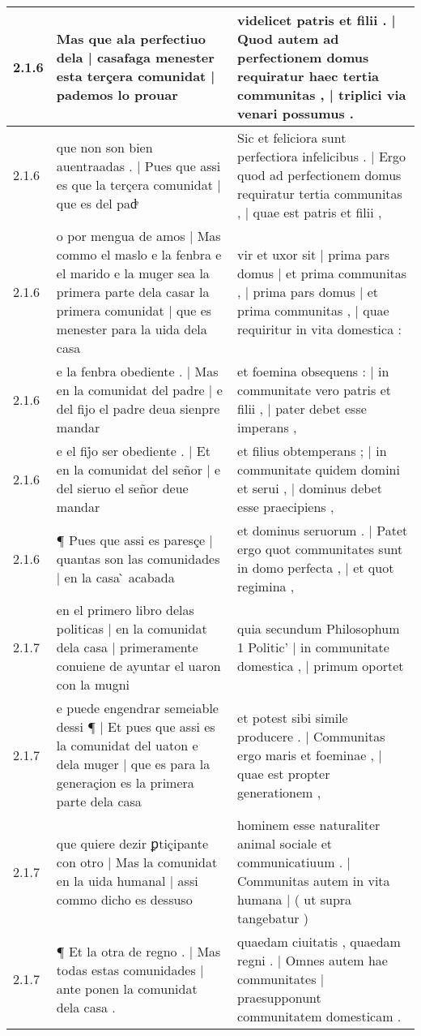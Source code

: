 \begin{tabular}{|p{1cm}|p{6.5cm}|p{6.5cm}|}
2.1.6 & Mas que ala perfectiuo dela | casafaga menester esta terçera comunidat | pademos lo prouar & videlicet patris et filii . | Quod autem ad perfectionem domus requiratur haec tertia communitas , | triplici via venari possumus . \\\hline
2.1.6 & que non son bien auentraadas . | Pues que assi es que la terçera comunidat | que es del padͤ & Sic et feliciora sunt perfectiora infelicibus . | Ergo quod ad perfectionem domus requiratur tertia communitas , | quae est patris et filii , \\\hline
2.1.6 & o por mengua de amos | Mas commo el maslo e la fenbra e el marido e la muger sea la primera parte dela casar la primera comunidat | que es menester para la uida dela casa & vir et uxor sit | prima pars domus | et prima communitas , | prima pars domus | et prima communitas , | quae requiritur in vita domestica : \\\hline
2.1.6 & e la fenbra obediente . | Mas en la comunidat del padre | e del fijo el padre deua sienpre mandar & et foemina obsequens : | in communitate vero patris et filii , | pater debet esse imperans , \\\hline
2.1.6 & e el fij̉o ser obediente . | Et en la comunidat del señor | e del sieruo el señor deue mandar & et filius obtemperans ; | in communitate quidem domini et serui , | dominus debet esse praecipiens , \\\hline
2.1.6 & ¶ Pues que assi es paresçe | quantas son las comunidades | en la casa ̀ acabada & et dominus seruorum . | Patet ergo quot communitates sunt in domo perfecta , | et quot regimina , \\\hline
2.1.7 & en el primero libro delas politicas | en la comunidat dela casa | primeramente conuiene de ayuntar el uaron con la mugni & quia secundum Philosophum 1 Politic’ | in communitate domestica , | primum oportet \\\hline
2.1.7 & e puede engendrar semeiable dessi ¶ | Et pues que assi es la comunidat del uaton e dela muger | que es para la generaçion es la primera parte dela casa & et potest sibi simile producere . | Communitas ergo maris et foeminae , | quae est propter generationem , \\\hline
2.1.7 & que quiere dezir ꝑtiçipante con otro | Mas la comunidat en la uida humanal | assi commo dicho es dessuso & hominem esse naturaliter animal sociale et communicatiuum . | Communitas autem in vita humana | ( ut supra tangebatur ) \\\hline
2.1.7 & ¶ Et la otra de regno . | Mas todas estas comunidades | ante ponen la comunidat dela casa . & quaedam ciuitatis , quaedam regni . | Omnes autem hae communitates | praesupponunt communitatem domesticam . \\\hline

\end{tabular}
